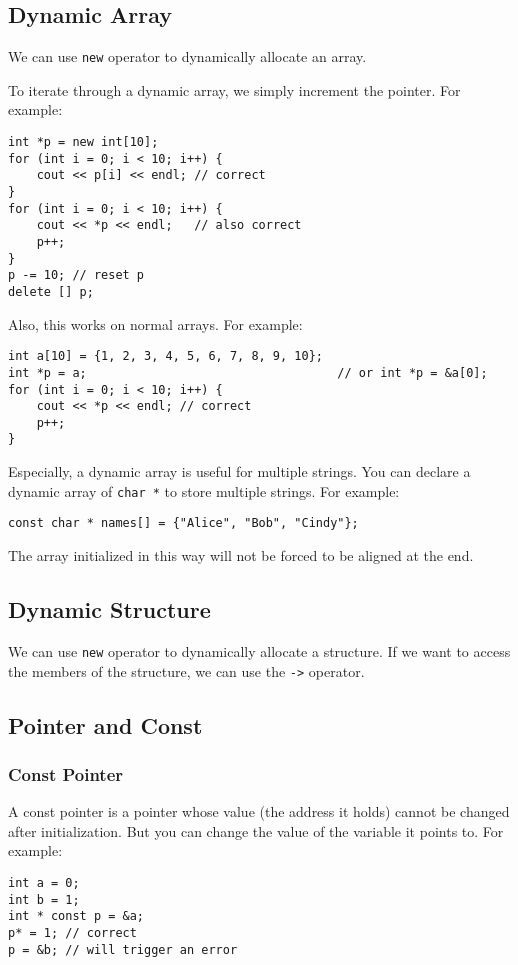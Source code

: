 \documentclass[a4paper,12pt]{article}
\begin{document}
\subsection{Dynamic Array}

We can use \texttt{new} operator to dynamically allocate an array.

To iterate through a dynamic array, we simply increment the pointer.
For example:
\begin{verbatim}
int *p = new int[10];
for (int i = 0; i < 10; i++) {
    cout << p[i] << endl; // correct
}
for (int i = 0; i < 10; i++) {
    cout << *p << endl;   // also correct
    p++;                  
}
p -= 10; // reset p
delete [] p;
\end{verbatim}

Also, this works on normal arrays.
For example:
\begin{verbatim}
int a[10] = {1, 2, 3, 4, 5, 6, 7, 8, 9, 10};
int *p = a;                                   // or int *p = &a[0];
for (int i = 0; i < 10; i++) {
    cout << *p << endl; // correct
    p++;
}
\end{verbatim}

Especially, a dynamic array is useful for multiple strings.
You can declare a dynamic array of \texttt{char *} to store multiple strings.
For example:
\begin{verbatim}
const char * names[] = {"Alice", "Bob", "Cindy"};
\end{verbatim}

The array initialized in this way will not be forced to be aligned at the end.

\subsection{Dynamic Structure}

We can use \texttt{new} operator to dynamically allocate a structure.
If we want to access the members of the structure, we can use the \texttt{->} operator.

\subsection{Pointer and Const}

\subsubsection{Const Pointer}

A const pointer is a pointer whose value (the address it holds) cannot be changed after initialization.
But you can change the value of the variable it points to.
For example:
\begin{verbatim}
int a = 0;
int b = 1;
int * const p = &a;
p* = 1; // correct
p = &b; // will trigger an error
\end{verbatim}
\end{document}
